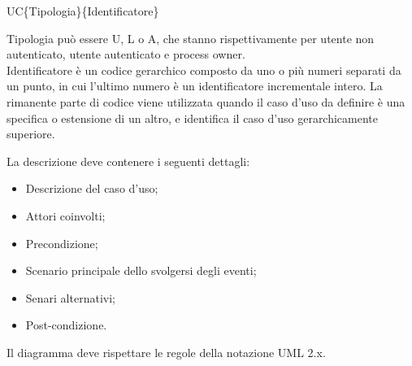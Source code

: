 \begin{center}UC\{Tipologia\}\{Identificatore\}\end{center}
Tipologia può essere U, L o A, che stanno rispettivamente per utente non autenticato, utente autenticato e process owner.\\
Identificatore è un codice gerarchico composto da uno o più numeri separati da un punto, in cui l'ultimo numero è un identificatore incrementale intero.
La rimanente parte di codice viene utilizzata quando il caso d'uso da definire è una specifica o estensione di un altro, e identifica il caso d'uso gerarchicamente superiore.

\begin{flushleft}
La descrizione deve contenere i seguenti dettagli:
\end{flushleft}

\begin{itemize}
\item Descrizione del caso d'uso;
\item Attori coinvolti;
\item Precondizione;
\item Scenario principale dello svolgersi degli eventi;
\item Senari alternativi;
\item Post-condizione.
\end{itemize}

\begin{flushleft}
Il diagramma deve rispettare le regole della notazione UML 2.x.
\end{flushleft}
